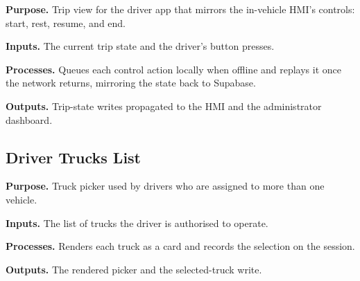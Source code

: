 \noindent\textbf{Purpose.} Trip view for the driver app that mirrors the in-vehicle HMI's controls: start, rest, resume, and end.

\noindent\textbf{Inputs.} The current trip state and the driver's button presses.

\noindent\textbf{Processes.} Queues each control action locally when offline and replays it once the network returns, mirroring the state back to Supabase.

\noindent\textbf{Outputs.} Trip-state writes propagated to the HMI and the administrator dashboard.



\subsection{Driver Trucks List}
\label{sec:code_frontend_driver_trucks}

\noindent\textbf{Purpose.} Truck picker used by drivers who are assigned to more than one vehicle.

\noindent\textbf{Inputs.} The list of trucks the driver is authorised to operate.

\noindent\textbf{Processes.} Renders each truck as a card and records the selection on the session.

\noindent\textbf{Outputs.} The rendered picker and the selected-truck write.


